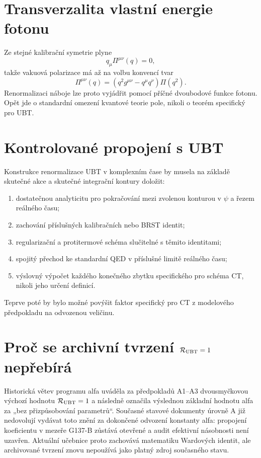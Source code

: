 \section{Transverzalita vlastní energie fotonu}
Ze stejné kalibrační symetrie plyne
\[
 q_\mu\Pi^{\mu\nu}(q)=0,
\]
takže vakuová polarizace má až na volbu konvencí tvar
\[
 \Pi^{\mu\nu}(q)
 =\left(q^2g^{\mu\nu}-q^\mu q^\nu\right)\Pi(q^2).
\]
Renormalizaci náboje lze proto vyjádřit pomocí příčné dvoubodové funkce fotonu.
Opět jde o standardní omezení kvantové teorie pole, nikoli o teorém specifický
pro UBT.

\section{Kontrolované propojení s UBT}
Konstrukce renormalizace UBT v komplexním čase by musela na základě skutečné
akce a skutečné integrační kontury doložit:
\begin{enumerate}
 \item dostatečnou analyticitu pro pokračování mezi zvolenou konturou v $\psi$
       a řezem reálného času;
 \item zachování příslušných kalibračních nebo BRST identit;
 \item regularizační a protitermové schéma slučitelné s těmito identitami;
 \item spojitý přechod ke standardní QED v příslušné limitě reálného času;
 \item výslovný výpočet každého konečného zbytku specifického pro schéma CT,
       nikoli jeho určení definicí.
\end{enumerate}
Teprve poté by bylo možné povýšit faktor specifický pro CT z modelového
předpokladu na odvozenou veličinu.

\section{Proč se archivní tvrzení \(\mathcal R_{\rm UBT}=1\) nepřebírá}
Historická větev programu alfa uváděla za předpokladů A1--A3 dvousmyčkovou
výchozí hodnotu \(\mathcal R_{\rm UBT}=1\) a následně označila výslednou základní
hodnotu alfa za „bez přizpůsobování parametrů“. Současné stavové dokumenty úrovně A již
nedovolují vydávat toto znění za dokončené odvození konstanty alfa: propojení
koeficientu v mezeře G137-B zůstává otevřené a audit efektivní násobnosti není
uzavřen. Aktuální učebnice proto zachovává matematiku Wardových identit, ale
archivované tvrzení znovu nepoužívá jako platný zdroj současného stavu.


